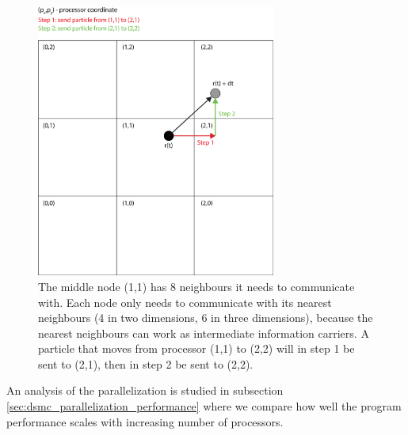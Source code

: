 \begin{figure}[htpb]
\begin{center}
\includegraphics[width=0.7\textwidth, trim=0cm 0cm 0cm 0cm, clip]{DSMC/figures/parallelization_facet_technique.eps}
\end{center}
\caption{The middle node (1,1) has 8 neighbours it needs to communicate with. Each node only needs to communicate with its nearest neighbours (4 in two dimensions, 6 in three dimensions), because the nearest neighbours can work as intermediate information carriers. A particle that moves from processor (1,1) to (2,2) will in step 1 be sent to (2,1), then in step 2 be sent to (2,2).}
\label{fig:parallelization_facet_technique}
\end{figure}
An analysis of the parallelization is studied in subsection \ref{sec:dsmc_parallelization_performance} where we compare how well the program performance scales with increasing number of processors. 